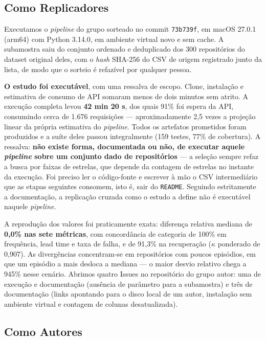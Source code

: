 \documentclass[12pt]{article}
\begin{document}
\subsection{Como Replicadores}

Executamos o \emph{pipeline} do grupo sorteado no commit \texttt{73b739f}, em macOS 27.0.1
(arm64) com Python 3.14.0, em ambiente virtual novo e sem cache. A subamostra saiu do
conjunto ordenado e deduplicado dos 300 repositórios do dataset original deles, com o
\emph{hash} SHA-256 do CSV de origem registrado junto da lista, de modo que o sorteio é
refazível por qualquer pessoa.

\textbf{O estudo foi executável}, com uma ressalva de escopo. Clone, instalação e estimativa
de consumo de API somaram menos de dois minutos sem atrito. A execução completa levou
\textbf{42 min 20 s}, dos quais 91\% foi espera da API, consumindo cerca de 1.676 requisições
--- aproximadamente 2,5 vezes a projeção linear da própria estimativa do \emph{pipeline}.
Todos os artefatos prometidos foram produzidos e a suíte deles passou integralmente (159
testes, 77\% de cobertura). A ressalva: \textbf{não existe forma, documentada ou não, de
executar aquele \emph{pipeline} sobre um conjunto dado de repositórios} --- a seleção sempre
refaz a busca por faixas de estrelas, que depende da contagem de estrelas no instante da
execução. Foi preciso ler o código-fonte e escrever à mão o CSV intermediário que as etapas
seguintes consomem, isto é, sair do \texttt{README}. Seguindo estritamente a documentação, a
replicação cruzada como o estudo a define não é executável naquele \emph{pipeline}.

A reprodução dos valores foi praticamente exata: diferença relativa mediana de
\textbf{0,0\% nas sete métricas}, com concordância de categoria de 100\% em frequência, lead
time e taxa de falha, e de 91,3\% na recuperação ($\kappa$ ponderado de 0,907). As divergências
concentram-se em repositórios com poucos episódios, em que um episódio a mais desloca a
mediana --- o maior desvio relativo chega a 945\% nesse cenário. Abrimos quatro Issues no
repositório do grupo autor: uma de execução e documentação (ausência de parâmetro para a
subamostra) e três de documentação (links apontando para o disco local de um autor,
instalação sem ambiente virtual e contagem de colunas desatualizada).

\subsection{Como Autores}
\end{document}
